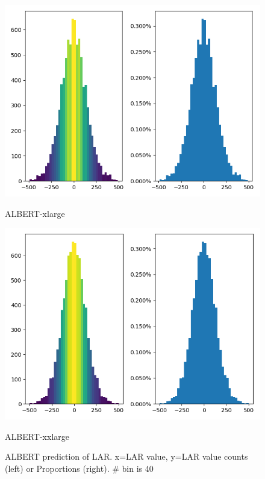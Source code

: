 \documentclass[letterpaper]{article} %
\begin{document}
\begin{figure}[!ht]
\begin{minipage}[b]{0.45\textwidth}
    \includegraphics[width=\textwidth]{SWOW_albert_xlarge.png}
    \caption*{ALBERT-xlarge}
  \end{minipage}
  \hfill
  \begin{minipage}[b]{0.45\textwidth}
    \includegraphics[width=\textwidth]{SWOW_albert_xxlarge.png}
    \caption*{ALBERT-xxlarge}
  \end{minipage}
\caption{ALBERT prediction of LAR. x=LAR value, y=LAR value counts (left) or Proportions (right). \# bin is 40}
\label{fig:laralbert}
\end{figure}
\end{document}
